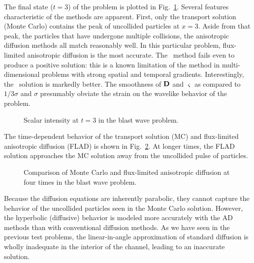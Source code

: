 The final state ($t=3$) of the problem is plotted in Fig.~\ref{fig:tdBlastwave}.
Several features characteristic of the methods are apparent. First, only the
transport solution (Monte Carlo) contains the peak of uncollided particles at
$x=3$. Aside from that peak, the particles that have undergone
multiple collisions, the anisotropic diffusion methods all match reasonably
well. In this particular problem, flux-limited anisotropic diffusion is the most
accurate. The \Pone\ method fails even to produce a positive solution: this is a
known limitation of the method in multi-dimensional problems with strong spatial
and temporal gradients. Interestingly, the \APone\ solution is markedly better.
The smoothness of $\mathbf{D}$ and $\varsigma$ as compared to $1/3\sigma$ and
$\sigma$ presumably obviate the strain on the wavelike behavior of the problem.

\begin{figure}[tb]
  \centering\small

  \caption{Scalar intensity at $t=3$ in the blast wave problem.}
  \label{fig:tdBlastwave}
\end{figure}

The time-dependent behavior of the transport solution (MC) and flux-limited
anisotropic diffusion (FLAD) is shown in Fig.~\ref{fig:tdBlastwaveAll}. At longer
times, the FLAD solution approaches the MC solution away from the uncollided
pulse of particles.

\begin{figure}[tb]
  \centering\small
    \hspace{-.15in}%
    

  \caption{Comparison of Monte Carlo and flux-limited anisotropic diffusion at
  four times in the blast wave problem.}
  \label{fig:tdBlastwaveAll}
\end{figure}

Because the diffusion equations are inherently parabolic, they cannot capture
the behavior of the uncollided particles seen in the Monte Carlo solution.
However, the hyperbolic (diffusive) behavior is modeled more accurately with
the AD methods than with conventional diffusion methods. As we have seen in the
previous test problems, the linear-in-angle approximation of standard diffusion
is wholly inadequate in the interior of the channel, leading to an inaccurate
solution.

